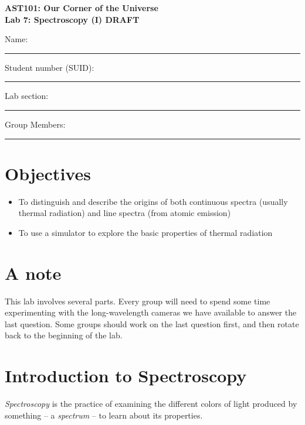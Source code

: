 \documentclass[11pt]{article}
\begin{document}
\begin{center}
\textbf{\Large
AST101: Our Corner of the Universe \\
\vspace*{0.1cm}
Lab 7: Spectroscopy (I) DRAFT
}
\end{center}

\vspace*{0.5cm}

{\Large Name:}\vspace*{0.5cm}\\\hrule
{\Large Student number (SUID):}\vspace*{0.5cm}\\\hrule
{\Large Lab section:}\vspace*{0.5cm}\\\hrule
{\Large Group Members:}\vspace*{0.5cm}\\\hrule
\vspace*{0.5cm}


\section{Objectives}
\begin{itemize}
	\item To distinguish and describe the origins of both continuous spectra (usually thermal radiation) and line spectra (from atomic emission)
	\item To use a simulator to explore the basic properties of thermal radiation
\end{itemize}

\section{A note}
This lab involves several parts. Every group will need to spend some time experimenting with the long-wavelength cameras we have available to answer the last question. Some groups should work on the last question first, and then rotate back to the beginning of the lab.

\section{Introduction to Spectroscopy}

{\it Spectroscopy} is the practice of examining the different colors of light produced by something -- a {\it spectrum} -- to learn about
its properties.
\end{document}
